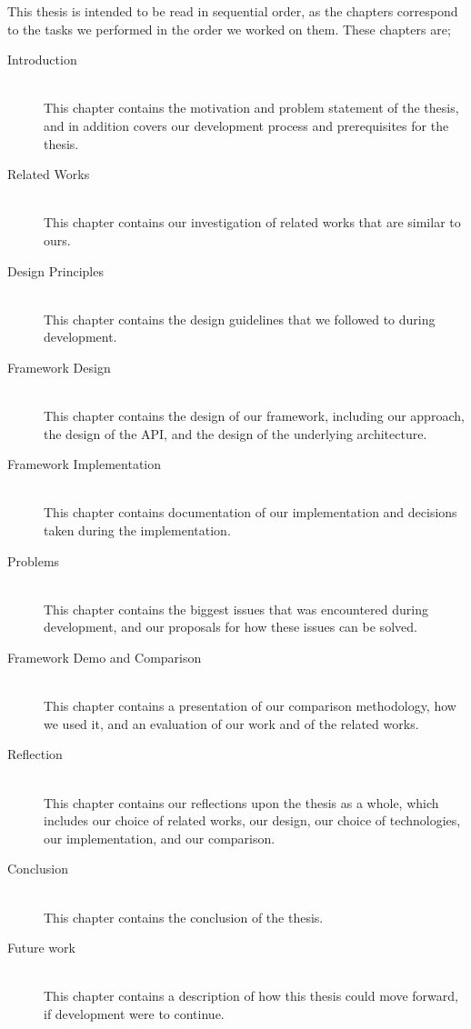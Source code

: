 This thesis is intended to be read in sequential order, as the chapters correspond to the tasks we performed in the order we worked on them. These chapters are;
\begin{description}
    \item[Introduction]\hfill\\
    This chapter contains the motivation and problem statement of the thesis, and in addition covers our development process and prerequisites for the thesis.
    \item[Related Works]\hfill\\
    This chapter contains our investigation of related works that are similar to ours.
    \item[Design Principles]\hfill\\
    This chapter contains the design guidelines that we followed to during development.
    \item[Framework Design]\hfill\\
    This chapter contains the design of our framework, including our approach, the design of the API, and the design of the underlying architecture.
    \item[Framework Implementation]\hfill\\
    This chapter contains documentation of our implementation and decisions taken during the implementation.
    \item[Problems] \hfill\\
    This chapter contains the biggest issues that was encountered during development, and our proposals for how these issues can be solved.
    \item[Framework Demo and Comparison]\hfill\\
    This chapter contains a presentation of our comparison methodology, how we used it, and an evaluation of our work and of the related works.
    \item[Reflection]\hfill\\
    This chapter contains our reflections upon the thesis as a whole, which includes our choice of related works, our design, our choice of technologies, our implementation, and our comparison.
    \item[Conclusion]\hfill\\
    This chapter contains the conclusion of the thesis.
    \item[Future work]\hfill\\
    This chapter contains a description of how this thesis could move forward, if development were to continue.
\end{description}